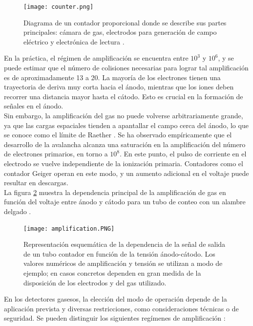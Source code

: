 \documentclass{article}
\begin{document}
\begin{figure}[H]
    \centering
    \texttt{[image: counter.png]}
    \caption{Diagrama de un contador proporcional donde se describe sus partes principales: cámara de gas, electrodos para generación de campo eléctrico y electrónica de lectura \cite{winkler2015}.}
    \label{fig:counter}
\end{figure}


\noindent En la práctica, el régimen de amplificación se encuentra entre \(10^3\) y \(10^6\), y se puede estimar que el número de colisiones necesarias para lograr tal amplificación es de aproximadamente 13 a 20. La mayoría de los electrones tienen una trayectoria de deriva muy corta hacia el ánodo, mientras que los iones deben recorrer una distancia mayor hasta el cátodo. Esto es crucial en la formación de señales en el ánodo.\\

\noindent Sin embargo, la amplificación del gas no puede volverse arbitrariamente grande, ya que las cargas espaciales tienden a apantallar el campo cerca del ánodo, lo que se conoce como el límite de Raether \cite{raether1964electron}. Se ha observado empíricamente que el desarrollo de la avalancha alcanza una saturación en la amplificación del número de electrones primarios, en torno a \(10^8\). En este punto, el pulso de corriente en el electrodo se vuelve independiente de la ionización primaria. Contadores como el contador Geiger operan en este modo, y un aumento adicional en el voltaje puede resultar en descargas.\\

\noindent La figura \ref{fig:amplification} muestra la dependencia principal de la amplificación de gas en función del voltaje entre ánodo y cátodo para un tubo de conteo con un alambre delgado \cite{montgomery1941geiger}. 


\begin{figure}[H]
    \centering
    \texttt{[image: amplification.PNG]}
    \caption{Representación esquemática de la dependencia de la
    señal de salida de un tubo contador en función de la tensión ánodo-cátodo. Los valores numéricos de amplificación y tensión se utilizan a modo de ejemplo; en casos concretos dependen en gran medida de la disposición de los electrodos y del gas utilizado. }
    \label{fig:amplification}
\end{figure}

\noindent En los detectores gasesos, la elección del modo de operación depende de la aplicación prevista y diversas restricciones, como consideraciones técnicas o de seguridad. Se pueden distinguir los siguientes regímenes de amplificación \cite{kolanoski2020particle3}: 
\end{document}
